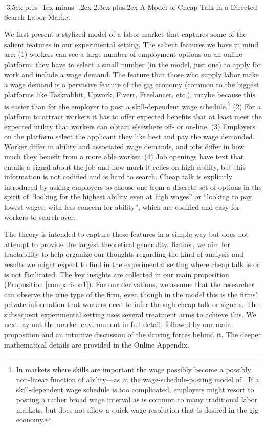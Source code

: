\documentclass[12pt]{article}
\makeatletter
\renewcommand{\section}{%
  \@startsection{section}{1}{\z@}%
  {-3.5ex plus -1ex minus -.2ex}%
  {2.3ex plus.2ex}%
  {\normalfont\Large\bfseries}%
}
\makeatother
\begin{document}
\section{A Model of Cheap Talk in a Directed Search Labor Market} \label{sec:theory}

We first present a stylized model of a labor market that captures some of the salient features in our experimental setting. The salient features we have in mind are: (1) workers can see a large number of employment options on an online platform; they have to select a small number (in the model, just one) to apply for work and include a wage demand. The feature that those who supply labor make a wage demand is a pervasive feature of the gig economy (common to the biggest platforms like Taskrabbit, Upwork, Fiverr, Freelancer, etc.), maybe because this is easier than for the employer to post a skill-dependent wage schedule.\footnote{In markets where skills are important the wage possibly become a possibly non-linear function of ability---as in the wage-schedule-posting model of \cite{shimer_2005}. If a skill-dependent wage schedule is too complicated, employers might resort to posting a rather broad wage interval as is common to many traditional labor markets, but does not allow a quick wage resolution that is desired in the gig economy.} (2) For a platform to attract workers it has to offer expected benefits that at least meet the expected utility that workers can obtain elsewhere off- or on-line. (3) Employers on the platform select the applicant they like best and pay the wage demanded.
Worker differ in ability and associated wage demands, and jobs differ in how much they benefit from a more able worker.
(4) Job openings have text that entails a signal about the job and how much it relies on high ability, but this information is not codified and is hard to search. Cheap talk is explicitly introduced by asking employers to choose one from a discrete set of options in the spirit of ``looking for the highest ability even at high wages'' or ``looking to pay lowest wages, with less concern for ability'', which are codified and easy for workers to search over. 

The theory is intended to capture these features in a simple way but does not attempt to provide the largest theoretical generality.
Rather, we aim for tractability to help organize our thoughts regarding the kind of analysis and results we might expect to find in the experimental setting where cheap talk is or is not facilitated. The key insights are collected in our main proposition (Proposition \ref{comparison1}). For our derivations, we assume that the researcher can observe the true type of the firm, even though in the model this is the firms' private information that workers need to infer through cheap talk or signals. The subsequent experimental setting uses several treatment arms to achieve this. We next lay out the market environment in full detail, followed by our main proposition and an intuitive discussion of the driving forces behind it. The deeper mathematical details are provided in the Online Appendix.
\end{document}
